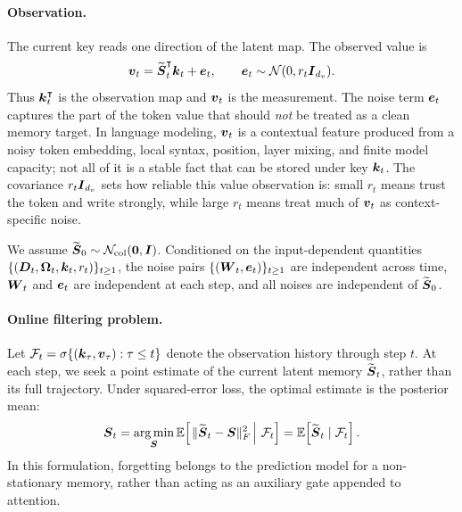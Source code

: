 \documentclass[11pt,letterpaper,logo]{yalearxiv}
\begin{document}
\paragraph{Observation.}
The current key reads one direction of the latent map. The observed value is
\begin{equation}
  \boldsymbol{v}_t = \widetilde{\boldsymbol{S}}_t^{\intercal}\boldsymbol{k}_t + \boldsymbol{e}_t,
  \qquad
  \boldsymbol{e}_t\sim\mathcal N(0,r_t \boldsymbol{I}_{d_v}).
  \label{eq:mem-update-observation}
\end{equation}
Thus $\boldsymbol{k}_t^{\intercal}$ is the observation map and $\boldsymbol{v}_t$ is the measurement. The noise term $\boldsymbol{e}_t$
captures the part of the token value that should \emph{not} be treated as a clean memory
target. In language modeling, $\boldsymbol{v}_t$ is a contextual feature produced from a noisy token embedding,
local syntax, position, layer mixing, and finite model capacity; not all of it is a stable
fact that can be stored under key $\boldsymbol{k}_t$. The covariance $r_t\boldsymbol{I}_{d_v}$ sets how reliable this value
observation is: small $r_t$ means trust the token and write strongly, while large $r_t$ means
treat much of $\boldsymbol{v}_t$ as context-specific noise.

We assume
$\widetilde{\boldsymbol{S}}_0\sim\mathcal N_{\mathrm{col}}(\boldsymbol{0},\boldsymbol{I})$.
Conditioned on the input-dependent quantities
$\{(\boldsymbol{D}_t,\boldsymbol{\Omega}_t,\boldsymbol{k}_t,r_t)\}_{t\geq1}$, the noise pairs
$\{(\boldsymbol{W}_t,\boldsymbol{e}_t)\}_{t\geq1}$ are independent across time,
$\boldsymbol{W}_t$ and $\boldsymbol{e}_t$ are independent at each step, and all noises are independent of
$\widetilde{\boldsymbol{S}}_0$.

\paragraph{Online filtering problem.}
Let $\mathcal{F}_t=\sigma\{(\boldsymbol{k}_\tau,\boldsymbol{v}_\tau):\tau\leq t\}$ denote the observation
history through step $t$. At each step, we seek a point estimate of the current latent memory
$\widetilde{\boldsymbol{S}}_t$, rather than its full trajectory. Under squared-error loss, the optimal estimate
is the posterior mean:
\begin{equation}
  \boldsymbol{S}_t
  =\operatorname*{arg\,min}_{\boldsymbol{S}}
    \mathbb{E}\!\left[\left.\|\widetilde{\boldsymbol{S}}_t-\boldsymbol{S}\|_F^2\,\right|\,\mathcal{F}_t\right]
  =\mathbb{E}\!\left[\widetilde{\boldsymbol{S}}_t\mid\mathcal{F}_t\right].
  \label{eq:online-filtering-objective}
\end{equation}
In this formulation, forgetting belongs to the prediction model for a non-stationary memory,
rather than acting as an auxiliary gate appended to attention.
\end{document}
